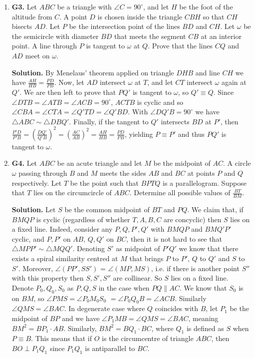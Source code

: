 \documentclass[11pt,a4paper]{article}
\begin{document}
\begin{enumerate}
\item\textbf{G3.} Let $ABC$ be a triangle with $\angle{C} = 90^{\circ}$, and let $H$ be the foot of the altitude from $C$. A point $D$ is chosen inside the triangle $CBH$ so that $CH$ bisects $AD$. Let $P$ be the intersection point of the lines $BD$ and $CH$. Let $\omega$ be the semicircle with diameter $BD$ that meets the segment $CB$ at an interior point. A line through $P$ is tangent to $\omega$ at $Q$. Prove that the lines $CQ$ and $AD$ meet on $\omega$.

\textbf{Solution.} By Menelaus' theorem applied on triangle $DHB$ and line $CH$ we have $\frac{AH}{HB}=\frac{PD}{PB}$. Now, let $AD$ intersect $\omega$ at $T$, and let $CT$ intersect $\omega$ again at $Q'$. We are then left to prove that $PQ'$ is tangent to $\omega$, so $Q'\equiv Q$. Since $\angle DTB=\angle ATB=\angle ACB=90^{\circ}$, $ACTB$ is cyclic and so $\angle CBA=\angle CTA=\angle Q'TD=\angle Q'BD$. With $\angle DQ'B=90^{\circ}$ we have $\triangle ABC\sim\triangle DBQ'$. Finally, if the tangent to $Q'$ intersects $BD$ at $P'$, then $\frac{P'D}{P'B}=(\frac{DQ'}{Q'B})^2=(\frac{AC}{AB})^2=\frac{AH}{HB}=\frac{PD}{PB}$, yielding $P\equiv P'$ and thus $PQ'$ is tangent to $\omega$.

\item\textbf{G4.} Let $ABC$ be an acute triangle and let $M$ be the midpoint of $AC$. A circle $\omega$ passing through $B$ and $M$ meets the sides $AB$ and $BC$ at points $P$ and $Q$ respectively. Let $T$ be the point such that $BPTQ$ is a parallelogram. Suppose that $T$ lies on the circumcircle of $ABC$. Determine all possible values of $\frac{BT}{BM}$.

\textbf{Solution.} Let $S$ be the common midpoint of $BT$ and $PQ$. We claim that, if $BMQP$ is cyclic (regardless of whether $T, A, B, C$ are concyclic) then $S$ lies on a fixed line. Indeed, consider any $P, Q, P', Q'$ with $BMQP$ and $BMQ'P'$ cyclic, and $P, P'$ on $AB$, $Q, Q'$ on $BC$, then it is not hard to see that $\triangle MPP'\sim\triangle MQQ'$. Denoting $S'$ as midpoint of $P'Q'$ we know that there exists a spiral similarity centred at $M$ that brings $P$ to $P'$, $Q$ to $Q'$ and $S$ to $S'$. Moreover, $\angle (PP', SS')$ = $\angle (MP, MS)$, i.e. if there is another point $S''$ with this property then $S, S', S''$ are collinear. So $S$ lies on a fixed line. Denote $P_0, Q_0, S_0$ as $P, Q, S$ in the case when $PQ\parallel AC$. We know that $S_0$ is on $BM$, so $\angle PMS=\angle P_0M_0S_0$ $= \angle P_0Q_0B = \angle ACB.$ Similarly $\angle QMS=\angle BAC$. In degenerate case where $Q$ coincides with $B$, let $P_1$ be the midpoint of $BP$ and we have $\angle P_1MB=\angle QMS=\angle BAC$, meaning $BM^2=BP_1\cdot AB$. Similarly, $BM^2=BQ_1\cdot BC$, where $Q_1$ is defined as $S$ when $P\equiv B$. This means that if $O$ is the circumcentre of triangle $ABC$, then $BO\perp P_1Q_1$ since $P_1Q_1$ is antiparallel to $BC$.


\end{enumerate}
\end{document}
